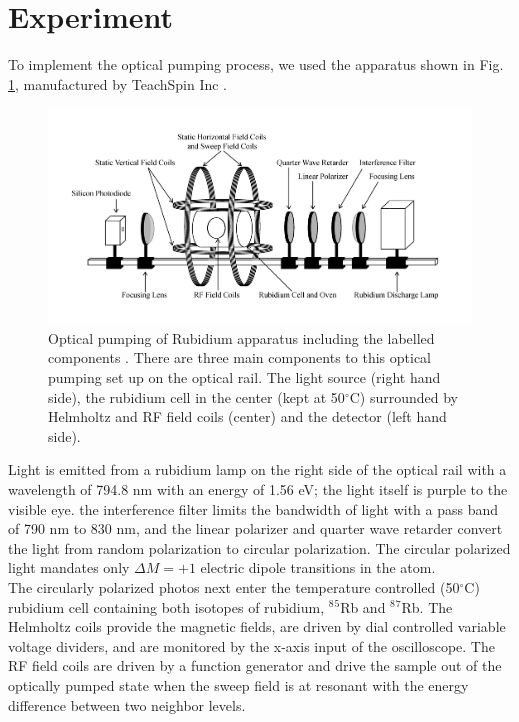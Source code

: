 \documentclass[prb,preprint]{revtex4-1}
\begin{document}
\section{Experiment}

To implement the optical pumping process, we used the apparatus shown in Fig. 
\ref{exp}, manufactured by TeachSpin Inc \cite{teach}. \\

\begin{figure}[h]
\centering
\includegraphics[width=16cm]{exp.jpg}
\caption{Optical pumping of Rubidium apparatus including the labelled components \cite{rib}. There are three main components to this optical pumping set up on the optical rail. The light source (right hand side), the rubidium cell in the center (kept at 50$^{\circ}$C) surrounded by Helmholtz and RF field coils (center) and the detector (left hand side). }
\label{exp}
\end{figure}


Light is emitted from a rubidium lamp on the right side of the optical rail with a wavelength of 794.8 nm with an energy of 1.56 eV; the light itself is purple to the visible eye.  the interference filter limits the bandwidth of light with a pass band of 790 nm to 830 nm, and the linear polarizer and quarter wave retarder convert the light from random polarization to circular polarization. The circular polarized light mandates only $\Delta M=+1$ electric dipole transitions in the atom.\\

The circularly polarized photos next enter the temperature controlled (50$^{\circ}$C) rubidium cell containing both isotopes of rubidium,   $^8$$^5$Rb and $^8$$^7$Rb. The Helmholtz coils provide the magnetic fields, are driven by dial controlled variable voltage dividers, and are monitored by the x-axis input of the oscilloscope. The RF field coils are driven by a function generator and drive the sample out of the optically pumped state when the sweep field is at resonant with the energy difference between two neighbor levels.\\
\end{document}
